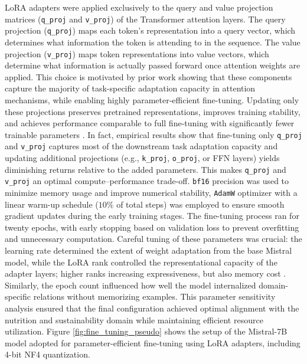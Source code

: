 LoRA adapters were applied exclusively to the query and value projection matrices (\texttt{q\_proj} and \texttt{v\_proj}) of the Transformer attention layers. The query projection (\texttt{q\_proj}) maps each token’s representation into a query vector, which determines what information the token is attending to in the sequence. The value projection (\texttt{v\_proj}) maps token representations into value vectors, which determine what information is actually passed forward once attention weights are applied. This choice is motivated by prior work showing that these components capture the majority of task-specific adaptation capacity in attention mechanisms, while enabling highly parameter-efficient fine-tuning. Updating only these projections preserves pretrained representations, improves training stability, and achieves performance comparable to full fine-tuning with significantly fewer trainable parameters \cite{hu2021lora}.
In fact, empirical results show that fine-tuning only \texttt{q\_proj} and \texttt{v\_proj} captures most of the downstream task adaptation capacity and updating additional projections (e.g., \texttt{k\_proj}, \texttt{o\_proj}, or FFN layers) yields diminishing returns relative to the added parameters. This makes \texttt{q\_proj} and \texttt{v\_proj} an optimal compute–performance trade-off.
\texttt{bf16} precision was used to minimize memory usage and improve numerical stability, \texttt{AdamW} optimizer \cite{adamW} with a linear warm-up schedule ($10 \%$ of total steps) was employed to ensure smooth gradient updates during the early training stages. The fine-tuning process ran for twenty epochs, with early stopping based on validation loss to prevent overfitting and unnecessary computation. Careful tuning of these parameters was crucial: the learning rate determined the extent of weight adaptation from the base Mistral model, while the LoRA rank controlled the representational capacity of the adapter layers; higher ranks increasing expressiveness, but also memory cost \cite{hu2021lora}. Similarly, the epoch count influenced how well the model internalized domain-specific relations without memorizing examples. This parameter sensitivity analysis ensured that the final configuration achieved optimal alignment with the nutrition and sustainability domain while maintaining efficient resource utilization. Figure \ref{fig:fine_tuning_pseudo} shows the setup of the Mistral-7B model adopted for parameter-efficient fine-tuning using LoRA adapters, including 4-bit NF4 quantization.

